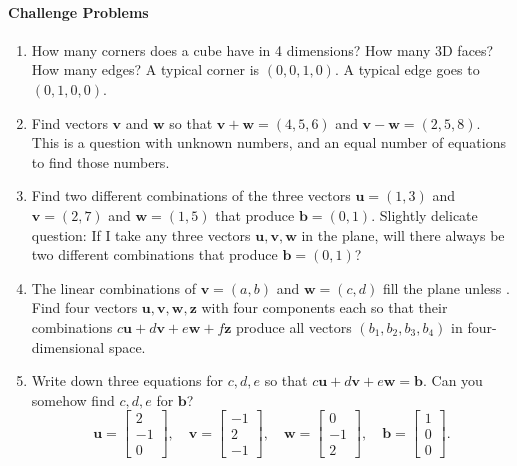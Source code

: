 \documentclass[14pt, a4paper]{article}
\begin{document}
\paragraph{Challenge Problems}
\begin{enumerate}[resume]
    \item How many corners does a cube have in 4 dimensions? How many 3D faces? How many edges? A typical corner is $(0,0,1,0)$. A typical edge goes to $(0,1,0,0)$.

    \item Find vectors $\boldsymbol{v}$ and $\boldsymbol{w}$ so that $\boldsymbol{v} + \boldsymbol{w} = (4,5,6)$ and $\boldsymbol{v} - \boldsymbol{w} = (2,5,8)$. This is a question with \underline{\hspace{2cm}} unknown numbers, and an equal number of equations to find those numbers.

    \item Find two different combinations of the three vectors $\boldsymbol{u} = (1,3)$ and $\boldsymbol{v} = (2,7)$ and $\boldsymbol{w} = (1,5)$ that produce $\boldsymbol{b} = (0,1)$. Slightly delicate question: If I take any three vectors $\boldsymbol{u}, \boldsymbol{v}, \boldsymbol{w}$ in the plane, will there always be two different combinations that produce $\boldsymbol{b} = (0,1)$?

    \item The linear combinations of $\boldsymbol{v} = (a,b)$ and $\boldsymbol{w} = (c,d)$ fill the plane unless \underline{\hspace{2cm}}. \\Find four vectors $\boldsymbol{u}, \boldsymbol{v}, \boldsymbol{w}, \boldsymbol{z}$ with four components each so that their combinations $c\boldsymbol{u} + d\boldsymbol{v} + e\boldsymbol{w} + f\boldsymbol{z}$ produce all vectors $(b_1, b_2, b_3, b_4)$ in four-dimensional space.

    \item Write down three equations for $c, d, e$ so that $c\boldsymbol{u} + d\boldsymbol{v} + e\boldsymbol{w} = \boldsymbol{b}$. Can you somehow find $c, d, e$ for $\boldsymbol{b}$?
          \[
              \boldsymbol{u} = \begin{bmatrix} 2 \\ -1 \\ 0 \end{bmatrix}, \quad
              \boldsymbol{v} = \begin{bmatrix} -1 \\ 2 \\ -1 \end{bmatrix}, \quad
              \boldsymbol{w} = \begin{bmatrix} 0 \\ -1 \\ 2 \end{bmatrix}, \quad
              \boldsymbol{b} = \begin{bmatrix} 1 \\ 0 \\ 0 \end{bmatrix}.
          \]
\end{enumerate}
\end{document}

